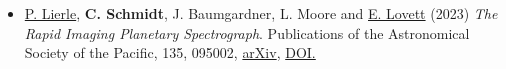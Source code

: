 \documentclass[12pt]{report}
\begin{document}
\begin{itemize}
  \item \underline{P. Lierle}, \textbf{C. Schmidt}, J. Baumgardner, L. Moore and \underline{E. Lovett} (2023) \textit{The Rapid Imaging Planetary Spectrograph}. Publications of the Astronomical Society of the Pacific, 135, 095002, \href{https://arxiv.org/abs/2307.16872}{arXiv}, \href{https://doi.org/10.1088/1538-3873/acec9f}{DOI.}

\end{itemize}
\end{document}
